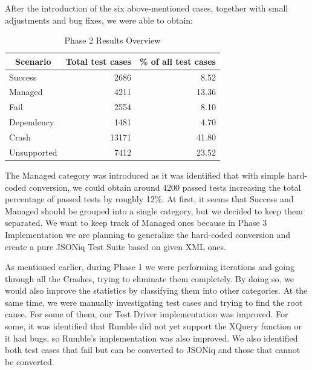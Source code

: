 After the introduction of the six above-mentioned cases, together with small adjustments and bug fixes, we were able to obtain:
\begin{table}[h!]
	\centering
	\begin{tabular}{|l|r|r|}
		\hline
		\multicolumn{1}{|c|}{Scenario} & \multicolumn{1}{c|}{Total test cases} & \multicolumn{1}{c|}{\% of all test cases} \\ \hline
		Success                        & 2686                                  & 8.52                                      \\ \hline
		Managed                        & 4211                                  & 13.36                                     \\ \hline
		Fail                           & 2554                                  & 8.10                                      \\ \hline
		Dependency                     & 1481                                  & 4.70                                      \\ \hline
		Crash                          & 13171                                 & 41.80                                     \\ \hline
		Unsupported                    & 7412                                  & 23.52                                     \\ \hline
	\end{tabular}
	\caption{Phase 2 Results Overview}
	\label{tab:Phase2_ResultTable}
\end{table}

\vspace{-5mm}
The Managed category was introduced as it was identified that with simple hard-coded conversion, we could obtain around 4200 passed tests increasing the total percentage of passed tests by roughly 12\%. At first, it seems that Success and Managed should be grouped into a single category, but we decided to keep them separated. We want to keep track of Managed ones because in Phase 3 Implementation we are planning to generalize the hard-coded conversion and create a pure JSONiq Test Suite based on given XML ones.

As mentioned earlier, during Phase 1 we were performing iterations and going through all the Crashes, trying to eliminate them completely. By doing so, we would also improve the statistics by classifying them into other categories. At the same time, we were manually investigating test cases and trying to find the root cause. For some of them, our Test Driver implementation was improved. For some, it was identified that Rumble did not yet support the XQuery function or it had bugs, so Rumble's implementation was also improved. We also identified both test cases that fail but can be converted to JSONiq and those that cannot be converted.

